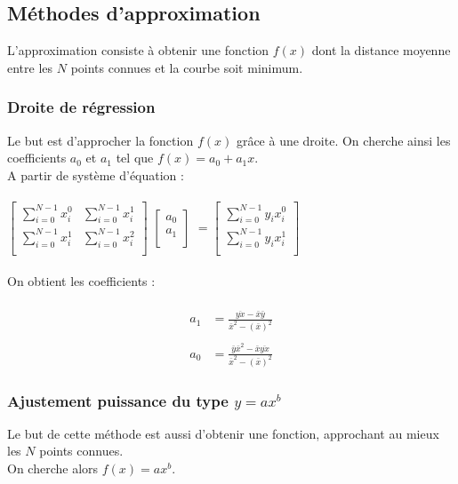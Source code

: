 \documentclass[12pt,french,titlepage]{article}
\begin{document}
	\subsection{Méthodes d'approximation}
	
	L'approximation consiste à obtenir une fonction $f(x)$ dont la distance moyenne entre les $N$ points connues et la courbe soit minimum.\\
	
	\subsubsection{Droite de régression}
	\label{regression}
	Le but est d'approcher la fonction $f(x)$ grâce à une droite. On cherche ainsi les coefficients $a_0$ et $a_1$ tel que $f(x)=a_0+a_1x$.\\
	A partir de système d'équation :\\\\
	$	
		\begin{bmatrix}
		\sum_{i=0}^{N-1}x_i^0&\sum_{i=0}^{N-1}x_i^1\\
		\sum_{i=0}^{N-1}x_i^1&\sum_{i=0}^{N-1}x_i^2\\
		\end{bmatrix}
	$
	$	
		\begin{bmatrix}
		a_0\\a_1\\
		\end{bmatrix}
	$
	$	
		=
		\begin{bmatrix}
		\sum_{i=0}^{N-1}y_ix_i^0\\
		\sum_{i=0}^{N-1}y_ix_i^1\\
		\end{bmatrix}
	$
	\\\\
	On obtient les coefficients :\\\\
	\begin{align*}
		a_1&=\frac{\overline{yx}-\bar{x}\bar{y}}{\bar{x}^2-(\bar{x})^2}\\\\
		a_0&=\frac{\bar{y}\bar{x}^2-\bar{x}\overline{yx}}{\bar{x}^2-(\bar{x})^2}
	\end{align*}
	\subsubsection{Ajustement puissance du type $y = ax^b$}
	\label{axb}
	Le but de cette méthode est aussi d'obtenir une fonction, approchant au mieux les $N$ points connues.\\
	On cherche alors $f(x)=ax^b$.\\
	
\end{document}
